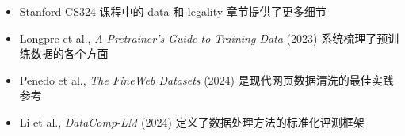 \begin{itemize}
    \item Stanford CS324 课程中的 data 和 legality 章节提供了更多细节
    \item Longpre et al., \textit{A Pretrainer's Guide to Training Data} (2023) 系统梳理了预训练数据的各个方面
    \item Penedo et al., \textit{The FineWeb Datasets} (2024) 是现代网页数据清洗的最佳实践参考
    \item Li et al., \textit{DataComp-LM} (2024) 定义了数据处理方法的标准化评测框架
\end{itemize}


